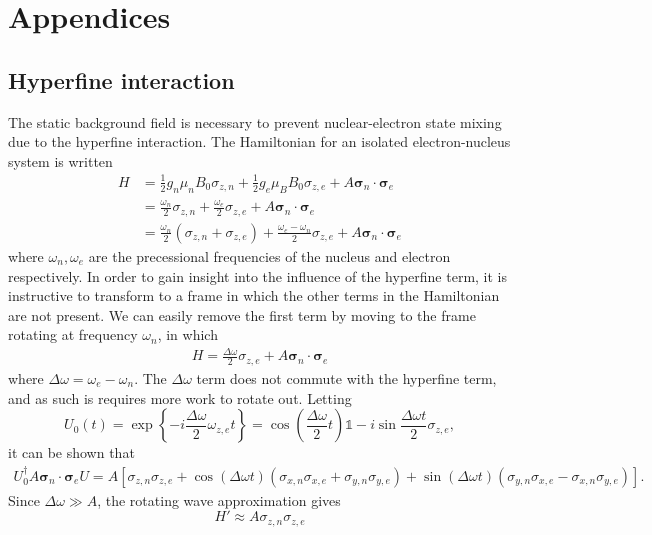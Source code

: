 \documentclass[../Thesis.tex]{subfiles}
\begin{document}
\chapter*{Appendices}


\section{Hyperfine interaction}
The static background field is necessary to prevent nuclear-electron state mixing due to the hyperfine interaction. The Hamiltonian for an isolated electron-nucleus system is written
\begin{align}
    H &= \frac{1}{2}g_n\mu_n B_0\sigma_{z,n} + \frac{1}{2}g_e\mu_B B_0\sigma_{z,e} + A\bm{\sigma}_n\cdot\bm{\sigma}_e\\
    &= \frac{\omega_n}{2}\sigma_{z,n} + \frac{\omega_e}{2}\sigma_{z,e}+A\bm{\sigma}_n\cdot\bm{\sigma}_e\\
    &= \frac{\omega_n}{2}(\sigma_{z,n}+\sigma_{z,e}) + \frac{\omega_e-\omega_n}{2}\sigma_{z,e}+A\bm{\sigma}_n\cdot\bm{\sigma}_e
\end{align}
where $\omega_n,\omega_e$ are the precessional frequencies of the nucleus and electron respectively. In order to gain insight into the influence of the hyperfine term, it is instructive to transform to a frame in which the other terms in the Hamiltonian are not present. We can easily remove the first term by moving to the frame rotating at frequency $\omega_n$, in which
\begin{align}
    H= \frac{\Delta\omega}{2}\sigma_{z,e}+A\bm{\sigma}_n\cdot\bm{\sigma}_e
\end{align}
where $\Delta\omega=\omega_{e}-\omega_n$. The $\Delta \omega$ term does not commute with the hyperfine term, and as such is requires more work to rotate out. Letting
\begin{equation}
    U_0(t) = \exp\left\{-i\frac{\Delta\omega}{2}\omega_{z,e}t\right\} = \cos\left(\frac{\Delta\omega}{2}t\right)\mathds{1} - i\sin\frac{\Delta\omega t}{2} \sigma_{z,e},
\end{equation}
it can be shown that
\begin{align}
    U_0^\dagger A\bm{\sigma}_n\cdot\bm{\sigma}_e U = A\left[\sigma_{z,n}\sigma_{z,e} + \cos(\Delta \omega t)(\sigma_{x,n}\sigma_{x,e}+\sigma_{y,n}\sigma_{y,e}) + \sin(\Delta \omega t)(\sigma_{y,n}\sigma_{x,e}-\sigma_{x,n}\sigma_{y,e})\right].
\end{align}
Since $\Delta\omega\gg A$, the rotating wave approximation gives
\begin{equation}
    H'\approx A\sigma_{z,n}\sigma_{z,e}
\end{equation}
\end{document}
